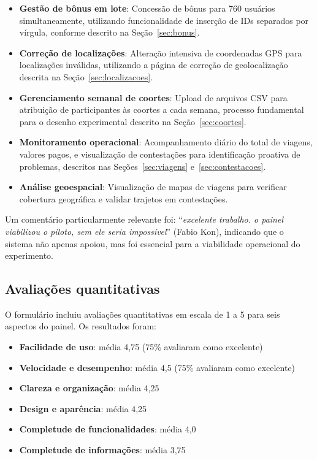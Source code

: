 \begin{itemize}
  \item \textbf{Gestão de bônus em lote}: Concessão de bônus para 760 usuários simultaneamente, utilizando funcionalidade de inserção de IDs separados por vírgula, conforme descrito na Seção~\ref{sec:bonus}.
  \item \textbf{Correção de localizações}: Alteração intensiva de coordenadas GPS para localizações inválidas, utilizando a página de correção de geolocalização descrita na Seção~\ref{sec:localizacoes}.
  \item \textbf{Gerenciamento semanal de coortes}: Upload de arquivos CSV para atribuição de participantes às coortes a cada semana, processo fundamental para o desenho experimental descrito na Seção~\ref{sec:coortes}.
  \item \textbf{Monitoramento operacional}: Acompanhamento diário do total de viagens, valores pagos, e visualização de contestações para identificação proativa de problemas, descritos nas Seções~\ref{sec:viagens} e~\ref{sec:contestacoes}.
  \item \textbf{Análise geoespacial}: Visualização de mapas de viagens para verificar cobertura geográfica e validar trajetos em contestações.
\end{itemize}

Um comentário particularmente relevante foi: ``\textit{excelente trabalho. o painel viabilizou o piloto, sem ele seria impossível}'' (Fabio Kon), indicando que o sistema não apenas apoiou, mas foi essencial para a viabilidade operacional do experimento.

\subsection{Avaliações quantitativas}

O formulário incluiu avaliações quantitativas em escala de 1 a 5 para seis aspectos do painel. Os resultados foram:

\begin{itemize}
  \item \textbf{Facilidade de uso}: média 4,75 (75\% avaliaram como excelente)
  \item \textbf{Velocidade e desempenho}: média 4,5 (75\% avaliaram como excelente)
  \item \textbf{Clareza e organização}: média 4,25
  \item \textbf{Design e aparência}: média 4,25
  \item \textbf{Completude de funcionalidades}: média 4,0
  \item \textbf{Completude de informações}: média 3,75
\end{itemize}

